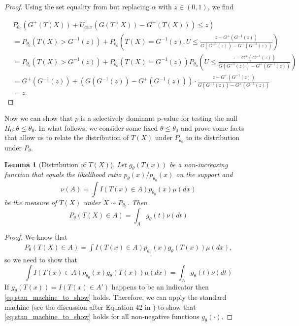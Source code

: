 \documentclass{article}
\newtheorem{lemma}{Lemma}
\begin{document}
\begin{appendix}
\begin{proof}

Using the set equality from  but replacing $\alpha$ with $z \in (0, 1)$, we find

\begin{align*}
        &P_{\theta_0}(G^+(T(X)) + U_{aux}(G(T(X)) - G^+(T(X))) \leq z)\\
        &= P_{\theta_0}(T(X) > G^{-1}(z)) + P_{\theta_0}\left(T(X) = G^{-1}(z),  U \leq \frac{z - G^+(G^{-1}(z))}{G(G^{-1}(z)) - G^{+}(G^{-1}(z))}\right)\\
        &= P_{\theta_0}(T(X) > G^{-1}(z)) + P_{\theta_0}(T(X) = G^{-1}(z)) P_{\theta_0}\left(U \leq \frac{z - G^+(G^{-1}(z))}{G(G^{-1}(z)) - G^{+}(G^{-1}(z))}\right)\\
        &=G^+(G^{-1}(z)) + (G(G^{-1}(z)) - G^{+}(G^{-1}(z))) \cdot \frac{z - G^+(G^{-1}(z))}{G(G^{-1}(z)) - G^{+}(G^{-1}(z))}\\
        &= z.
    \end{align*}

\end{proof}

Now we can show that $p$ is a selectively dominant p-value for testing the null $H_0: \theta \leq \theta_0$. In what follows, we consider some fixed $\theta \leq \theta_0$ and prove some facts that allow us to relate the distribution of $T(X)$ under $P_{\theta_0}$ to its distribution under $P_{\theta}$.

\begin{lemma}[Distribution of $T(X)$]
    \label{lem:stan_machine}
    Let $g_{\theta}(T(x))$ be a non-increasing function that equals the likelihood ratio $p_{\theta}(x)/p_{\theta_0}(x)$ on the support and 
    \begin{equation*}
        \nu(A) = \int I(T(x) \in A) p_{\theta_0}(x) \mu(dx)
    \end{equation*}
    be the measure of $T(X)$ under $X \sim P_{\theta_0}$. Then 
    \begin{equation*}
        P_{\theta}(T(X) \in A) = \int_A g_{\theta}(t) \nu(dt)
    \end{equation*}
\end{lemma}

\begin{proof}
We know that 
\begin{align*}
    P_{\theta}(T(X) \in A) = \int I(T(x) \in A) p_{\theta_0}(x)g_{\theta}(T(x)) \mu(dx), 
\end{align*}
so we need to show that 
\begin{equation}
    \label{eq:stan_machine_to_show}
    \int I(T(x) \in A) p_{\theta_0}(x) g_{\theta}(T(x)) \mu(dx) =  \int_A g_{\theta}(t) \nu(dt)
\end{equation}
If $g_{\theta}(T(x)) = I(T(x) \in A')$ happens to be an indicator then \eqref{eq:stan_machine_to_show} holds. Therefore, we can apply the standard machine (see the discussion after Equation 42 in \cite{Lei}) to show that \eqref{eq:stan_machine_to_show} holds for all non-negative functions $g_{\theta}(\cdot)$.  
\end{proof}



\end{appendix}
\end{document}
